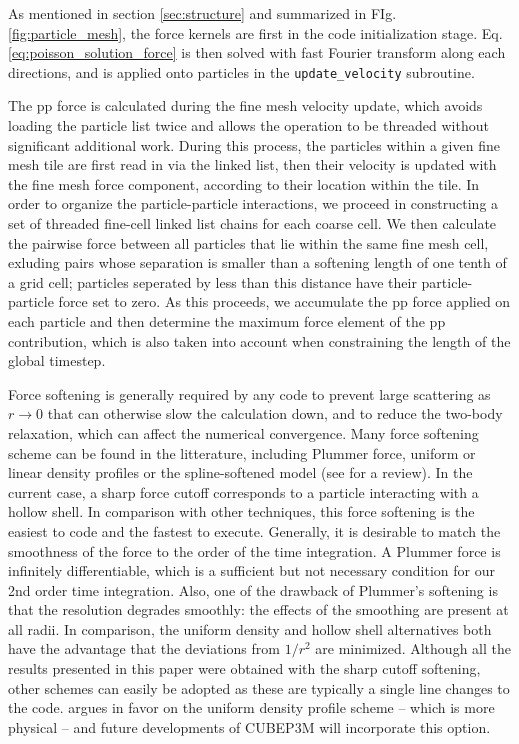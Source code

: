\documentclass[useAMS,usenatbib]{mn2e}
\begin{document}
As mentioned in section \ref{sec:structure} and summarized in FIg. \ref{fig:particle_mesh},
the force kernels are first  in the code initialization stage.
Eq. \ref{eq:poisson_solution_force} is then solved with fast Fourier transform along each directions, 
 and is applied onto particles in the {\tt update\_velocity} subroutine.

The pp force is calculated during the fine mesh velocity update, which avoids loading the particle list twice and allows the operation to be threaded without significant additional work. During this process, the particles within a given fine mesh tile are first read in via the linked list, 
then their velocity is updated with the fine mesh force component, according to their location within the tile. 
In order to organize the particle-particle interactions, we proceed in constructing a set of threaded fine-cell linked list chains for each coarse cell. 
We then calculate the pairwise force between all particles that lie within the same fine mesh cell, exluding pairs whose separation is smaller than a softening length of 
one tenth of a grid cell; particles seperated by less than this distance have their 
particle-particle force set to zero.  As this proceeds, we accumulate the  pp force applied on each particle and then determine the maximum force element of the pp contribution, which is also taken into account when constraining the length of the global timestep. 

Force softening is generally required by any code to prevent
large scattering as $r \rightarrow 0$ that can otherwise slow the calculation down, 
and to reduce the two-body relaxation, which can affect the numerical convergence. 
Many force softening scheme can be found in the litterature, including Plummer force, uniform or linear density profiles or the spline-softened model 
(see \citet{1993ApJ...409...60D} for a review). In the current case, a sharp force cutoff corresponds to a particle interacting with a hollow shell.
In comparison with other techniques, this  force softening is the easiest to code and the fastest to execute. 
Generally, it is desirable to match the smoothness of the force to the order of the time integration. 
A Plummer force is infinitely differentiable, which is a sufficient but not necessary condition for our 2nd order time integration.  
Also, one of the drawback of Plummer's softening is that the resolution degrades smoothly: the effects of the smoothing are present at all radii. 
In comparison, the uniform density and hollow shell alternatives both have the advantage that the deviations from $1/r^2$ are minimized. 
Although all the results presented in this paper were obtained with the sharp cutoff softening, other schemes can easily be adopted as these 
are typically a single line changes to the code. \citep{1993ApJ...409...60D} argues in favor on the uniform density profile scheme -- which is more physical --
and future developments of {\small CUBEP3M} will incorporate this option.
\end{document}
